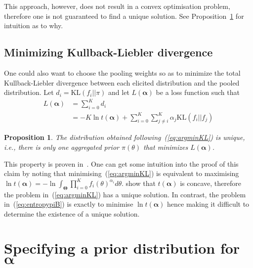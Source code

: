 \documentclass[a4paper, notitlepage, 10pt]{article}
\newtheorem{proposition}{Proposition}[]
\begin{document}
This approach, however, does not result in a convex optimisation problem, therefore one is not guaranteed to find a unique solution. 
See Proposition~\ref{prop:uniqueness} for intuition as to why.
\subsection*{Minimizing Kullback-Liebler divergence}

One could also want to choose the pooling weights so as to minimize the total Kullback-Liebler divergence between each elicited distribution and the pooled distribution.
Let $d_i = \text{KL}(f_i || \pi)$ and let $L(\boldsymbol\alpha)$ be a loss function such that
\begin{align}
L(\boldsymbol\alpha) &= \sum_{i=0}^Kd_i \\
 \label{eq:argminKL}
     &= -K\ln t(\boldsymbol\alpha) + \sum_{i=0}^K\sum_{j\neq i}^K\alpha_j\text{KL}(f_i||f_j)
\end{align}

\begin{proposition}
\label{prop:uniqueness}
 The distribution obtained following~(\ref{eq:argminKL}) is unique, i.e., there is only one aggregated prior $\pi(\theta)$ that minimizes $L(\boldsymbol\alpha)$.
\end{proposition}
This property is proven in~\cite{rufo2012A}.
One can get some intuition into the proof  of this claim by noting that minimising~(\ref{eq:argminKL}) is equivalent to maximising $\ln t(\boldsymbol\alpha) = -\ln\int_{\boldsymbol\Theta}\prod_{i=0}^{K}f_i(\theta)^{\alpha_i}d\theta$. 
\cite{rufo2012A} show that $t(\boldsymbol\alpha)$ is concave, therefore the problem in~(\ref{eq:argminKL}) has a unique solution.
In contrast, the problem in~(\ref{eq:entropypiB}) is exactly to minimise $\ln t(\boldsymbol\alpha)$ hence making it difficult to determine the existence of a unique solution.

\section*{Specifying a prior distribution for $\boldsymbol\alpha$}
\end{document}
